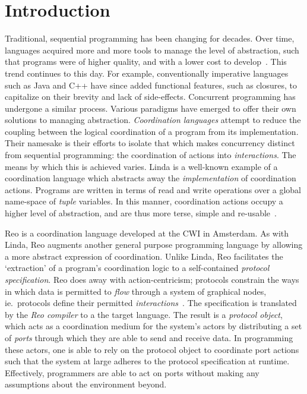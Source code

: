 \chapter{Introduction}	


Traditional, sequential programming has been changing for decades. Over time, languages acquired more and more tools to manage the level of abstraction, such that programs were of higher quality, and with a lower cost to develop~\cite{shaw1984abstraction}. This trend continues to this day. For example, conventionally imperative languages such as Java and C++ have since added functional features, such as closures, to capitalize on their brevity and lack of side-effects. Concurrent programming has undergone a similar process. Various paradigms have emerged to offer their own solutions to managing abstraction. \textit{Coordination languages} attempt to reduce the coupling between the logical coordination of a program from its implementation. Their namesake is their efforts to isolate that which makes concurrency distinct from sequential programming: the coordination of actions into \textit{interactions}. The means by which this is achieved varies. Linda is a well-known example of a coordination language which abstracts away the \textit{implementation} of coordination actions. Programs are written in terms of read and write operations over a global name-space of \textit{tuple} variables. In this manner, coordination actions occupy a higher level of abstraction, and are thus more terse, simple and re-usable~\cite{gelernter1985generative}.


Reo is a coordination language developed at the CWI in Amsterdam. As with Linda, Reo augments another general purpose programming language by allowing a more abstract expression of coordination. Unlike Linda, Reo facilitates the `extraction' of a program's coordination logic to a self-contained \textit{protocol specification}. Reo does away with action-centricism; protocols constrain the ways in which data is permitted to \textit{flow} through a system of graphical nodes, ie.\ protocols define their permitted \textit{interactions}~\cite{arbab2005abstract}. The specification is translated by the \textit{Reo compiler} to a the target language. The result is a \textit{protocol object}, which acts as a coordination medium for the system's actors by distributing a set of \textit{ports} through which they are able to send and receive data. In programming these actors, one is able to rely on the protocol object to coordinate port actions such that the system at large adheres to the protocol specification at runtime. Effectively, programmers are able to act on ports without making any assumptions about the environment beyond.

